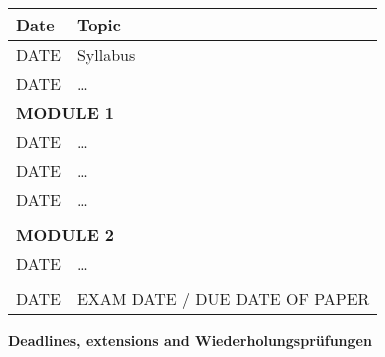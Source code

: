 \documentclass[12pt,fleqn,a4]{extarticle}
\newcommand{\6}{\mbox{$[\hspace*{-.6mm}[$}}
\newcommand{\9}{\mbox{$]\hspace*{-.6mm}]$}}
\begin{document}
\begin{longtable}{l p{15cm}}
{\bf Date} & {\bf Topic} \\ \hline

DATE & Syllabus  \\

DATE & \ldots \\ 

\multicolumn{2}{l}{\bf MODULE 1} \\ 

DATE & \ldots \\ 

DATE & \ldots \\ 

DATE & \ldots \\ 

& \\

\multicolumn{2}{l}{\bf MODULE 2} \\ 

DATE & \ldots \\

& \\

\hline\hline

DATE & EXAM DATE / DUE DATE OF PAPER \\ 

\hline\hline

\end{longtable}

{\bf Deadlines, extensions and Wiederholungspr\"ufungen}
\end{document}
